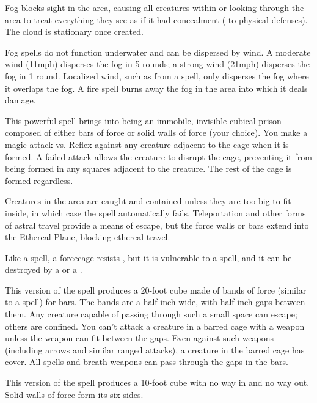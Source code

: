 \spelldur{\durshort}
\begin{spelleffect}
    Fog blocks sight in the area, causing all creatures within or looking through the area to treat everything they see as if it had concealment ( to physical defenses). The cloud is stationary once created.
\end{spelleffect}
\begin{spellnotes}
    Fog spells do not function underwater and can be dispersed by wind. A moderate wind (11\add mph) disperses the fog in 5 rounds; a strong wind (21\add mph) disperses the fog in 1 round. Localized wind, such as from a  spell, only disperses the fog where it overlaps the fog. A fire spell burns away the fog in the area into which it deals damage.
\end{spellnotes}

\spellrng{\rngmed}
\spelldur{\durlong \dismissable}
\begin{spelleffect}
    This powerful spell brings into being an immobile, invisible cubical prison composed of either bars of force or solid walls of force (your choice). You make a magic attack vs. Reflex against any creature adjacent to the cage when it is formed. A failed attack allows the creature to disrupt the cage, preventing it from being formed in any squares adjacent to the creature. The rest of the cage is formed regardless.
    \par Creatures in the area are caught and contained unless they are too big to fit inside, in which case the spell automatically fails. Teleportation and other forms of astral travel provide a means of escape, but the force walls or bars extend into the Ethereal Plane, blocking ethereal travel.
    \par Like a  spell, a forcecage resists , but it is vulnerable to a  spell, and it can be destroyed by a  or a .
    \par {} This version of the spell produces a 20-foot cube made of bands of force (similar to a  spell) for bars. The bands are a half-inch wide, with half-inch gaps between them. Any creature capable of passing through such a small space can escape; others are confined. You can't attack a creature in a barred cage with a weapon unless the weapon can fit between the gaps. Even against such weapons (including arrows and similar ranged attacks), a creature in the barred cage has cover. All spells and breath weapons can pass through the gaps in the bars.
    \par {} This version of the spell produces a 10-foot cube with no way in and no way out. Solid walls of force form its six sides.
\end{spelleffect}

